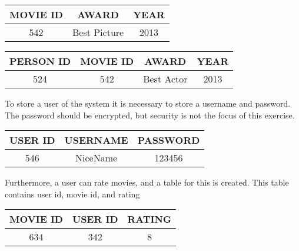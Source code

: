 \documentclass[10pt,a4paper,final]{report}
\begin{document}
\begin{table}[H] \centering
\begin{tabular}{|c|c|c|}
\hline 
MOVIE ID & AWARD & YEAR \\ 
\hline 
542 & Best Picture & 2013 \\ 
\hline 
\end{tabular} 
\end{table}

\begin{table}[H] \centering
\begin{tabular}{|c|c|c|c|}
\hline 
PERSON ID & MOVIE ID & AWARD & YEAR\\ 
\hline 
524 & 542 & Best Actor & 2013 \\ 
\hline 
\end{tabular} 
\end{table}

To store a user of the system it is necessary to store a username and password. The password should be encrypted, but security is not the focus of this exercise.

\begin{table}[H] \centering
\begin{tabular}{|c|c|c|}
\hline 
USER ID & USERNAME & PASSWORD \\ 
\hline 
546 & NiceName & 123456 \\ 
\hline 
\end{tabular} 
\end{table}

Furthermore, a user can rate movies, and a table for this is created. This table contains user id, movie id, and rating

\begin{table}[H] \centering
\begin{tabular}{|c|c|c|}
\hline 
MOVIE ID & USER ID & RATING \\ 
\hline 
634 & 342 & 8 \\ 
\hline 
\end{tabular} 
\end{table}
\end{document}
